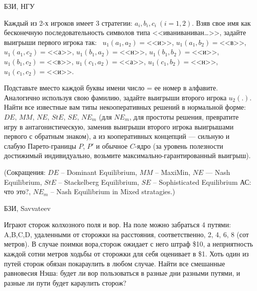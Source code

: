\begin{problem}
\begin{source}
БЗИ, НГУ
\end{source} {\rm Каждый из
2-х игроков имеет 3 стратегии: $a_i, b_i, c_i~ (i=1,2)$.
Взяв свое имя как бесконечную последовательность символов
типа <<иваниваниван\ldots >>, задайте выигрыши первого игрока
так:~ $u_1(a_1,a_{2}) = $<<и>>, $ u_1(a_1,b_{2}) = $<<в>>, $
u_1(a_1,c_{2}) = $<<а>>, $ u_1(b_1,a_{2}) = $<<н>>, $
u_1(b_1,b_{2}) = $<<и>>, $ u_1(b_1,c_{2}) = $<<в>>, $
u_1(c_1,a_{2}) = $<<а>>, $ u_1(c_1,b_{2}) = $<<н>>, $
u_1(c_1,c_{2}) = $<<и>>.

Подставьте вместо каждой буквы имени число = ее номер в
алфавите. Аналогично используя свою фамилию, задайте
выигрыши второго игрока $u_2(.)$. Найти все известные вам
типы некооперативных решений в нормальной форме: $DE$,
$MM$, $NE$, $StE$, $SE$, $NE_m$ (для $NE_m$, для простоты
решения, превратите игру в антагонистическую, заменив
выигрыши второго игрока выигрышами первого с обратным
знаком), а из кооперативных концепций --- сильную и слабую
Парето-границы $P$, $P'$ и обычное $C$-ядро (за уровень
полезности достижимый индивидуально,
возьмите максимально-гарантированный выигрыш).

(Сокращения: $DE$ -- Dominant Equilibrium, $MM$ -- MaxiMin,
$NE$ --- Nash Equilibrium, $StE$ -- Stackelberg Equilibrium,
$SE$ -- Sophisticated Equilibrium {\red АС: что это?}, $NE_m$ -- Nash
Equilibrium in Mixed stratagies.) }



\begin{sol}

\end{sol}
\end{problem}







\begin{problem}
\begin{source}
БЗИ, Savvateev
\end{source} 
Играют сторож колхозного поля и вор. На
поле можно забраться 4 путями: A,B,C,D, удаленными
от сторожки на расстояния, соответственно, 2, 4, 6,
8 (сот метров). В случае поимки вора,сторож
ожидает с него штраф \$10, а неприятность каждой
сотни метров ходьбы от сторожки для себя оценивает
в \$1. Хоть один из путей сторож обязан покараулить
в любом случае. Найти все смешанные равновесия
Нэша: будет ли  вор пользоваться в разные дни
разными путями, и разные ли пути будет караулить
сторож?






\begin{sol}

\end{sol}
\end{problem}





